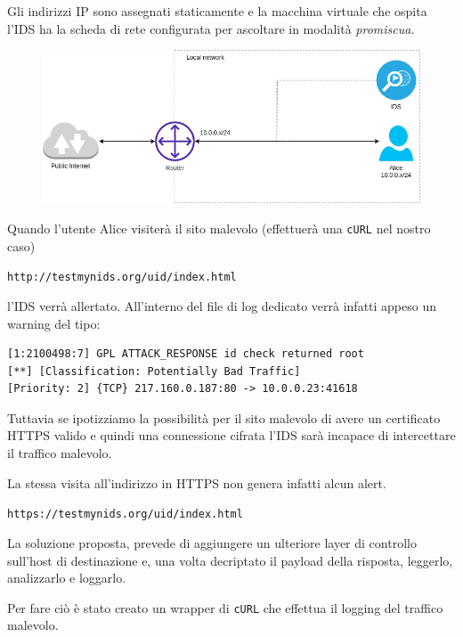 \documentclass{ldr-article}
\begin{document}
Gli indirizzi IP sono assegnati staticamente e la macchina virtuale che ospita l'IDS ha la scheda di rete configurata per ascoltare in modalità \textit{promiscua}.

\begin{figure}[htp]
    \centering
    \includegraphics[scale=0.5]{nids-schema.png}
\end{figure}

Quando l'utente Alice visiterà il sito malevolo (effettuerà una \texttt{cURL} nel nostro caso)

\texttt{http://testmynids.org/uid/index.html }

l'IDS verrà allertato. All'interno del file di log dedicato verrà infatti appeso un warning del tipo:

\begin{lstlisting}
[1:2100498:7] GPL ATTACK_RESPONSE id check returned root
[**] [Classification: Potentially Bad Traffic]
[Priority: 2] {TCP} 217.160.0.187:80 -> 10.0.0.23:41618
\end{lstlisting}

Tuttavia se ipotizziamo la possibilità per il sito malevolo di avere un certificato HTTPS valido e quindi una connessione cifrata l'IDS sarà incapace di intercettare il traffico malevolo.

La stessa visita all'indirizzo in HTTPS non genera infatti alcun alert.

\texttt{https://testmynids.org/uid/index.html }

La soluzione proposta, prevede di aggiungere un ulteriore layer di controllo sull'host di destinazione e, una volta decriptato il payload della risposta, leggerlo, analizzarlo e loggarlo.

Per fare ciò è stato creato un wrapper di \texttt{cURL} che effettua il logging del traffico malevolo.
\end{document}
